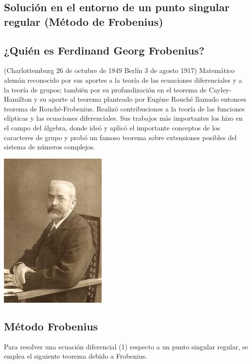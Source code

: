 \documentclass{article}
\begin{document}
\begin{center}
\section{Solución en el entorno de un punto singular regular (Método de Frobenius)}
\end{center}

\subsection{¿Quién es Ferdinand Georg Frobenius?}
\large (Charlottemburg 26 de octubre de 1849 Berlín 3 de agosto 1917) Matemático alemán reconocido por sus aportes a la teoría de las ecuaciones diferenciales y a la teoría de grupos; también por su profundización en el teorema de Cayley-Hamilton y su aporte al teorema planteado por Eugène Rouché llamado entonces teorema de Rouché-Frobenius.\newline
Realizó contribuciones a la teoría de las funciones elípticas y las ecuaciones diferenciales. Sus trabajos más importantes los hizo en el campo del álgebra, donde ideó y aplicó el importante conceptos de los caracteres de grupo y probó un famoso teorema sobre extensiones posibles del sistema de números complejos. \newline

\begin{center}
\includegraphics[scale=0.6]{GeorgFrobenius_(cropped).jpg} 
\end{center}

\subsection{Método Frobenius}
\large Para resolver una ecuación diferencial (1) respecto a un punto singular regular, se emplea el siguiente teorema debido a Frobenius. \newline
\end{document}
